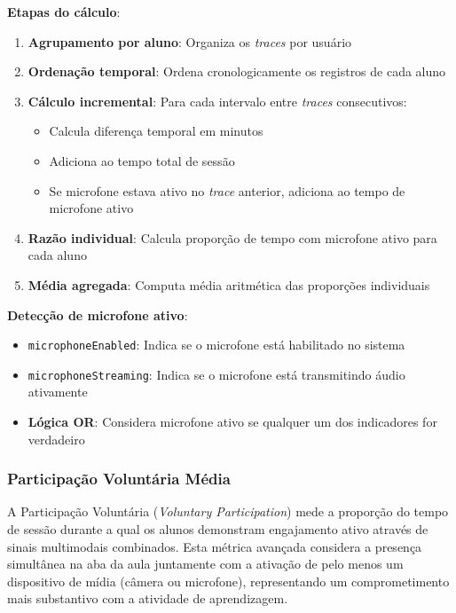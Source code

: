 \textbf{Etapas do cálculo}:
\begin{enumerate}
    \item \textbf{Agrupamento por aluno}: Organiza os \textit{traces} por usuário
    \item \textbf{Ordenação temporal}: Ordena cronologicamente os registros de cada aluno
    \item \textbf{Cálculo incremental}: Para cada intervalo entre \textit{traces} consecutivos:
          \begin{itemize}
              \item Calcula diferença temporal em minutos
              \item Adiciona ao tempo total de sessão
              \item Se microfone estava ativo no \textit{trace} anterior, adiciona ao tempo de microfone ativo
          \end{itemize}
    \item \textbf{Razão individual}: Calcula proporção de tempo com microfone ativo para cada aluno
    \item \textbf{Média agregada}: Computa média aritmética das proporções individuais
\end{enumerate}

\textbf{Detecção de microfone ativo}:
\begin{itemize}
    \item \texttt{microphoneEnabled}: Indica se o microfone está habilitado no sistema
    \item \texttt{microphoneStreaming}: Indica se o microfone está transmitindo áudio ativamente
    \item \textbf{Lógica OR}: Considera microfone ativo se qualquer um dos indicadores for verdadeiro
\end{itemize}

\subsubsection{Participação Voluntária Média}

A Participação Voluntária (\textit{Voluntary Participation}) mede a proporção do tempo de sessão durante a qual os alunos demonstram engajamento ativo através de sinais multimodais combinados. Esta métrica avançada considera a presença simultânea na aba da aula juntamente com a ativação de pelo menos um dispositivo de mídia (câmera ou microfone), representando um comprometimento mais substantivo com a atividade de aprendizagem.

